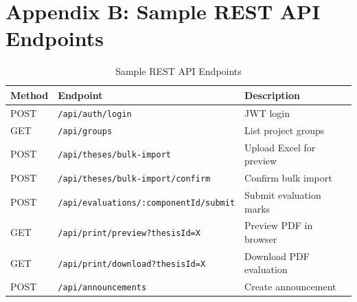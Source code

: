 \documentclass[12pt]{report}
\begin{document}
\section*{Appendix B: Sample REST API Endpoints}
\begin{table}[H]
\centering
\caption{Sample REST API Endpoints}
\label{tab:api_sample}
\begin{tabular}{l l l}
\toprule
\textbf{Method} & \textbf{Endpoint} & \textbf{Description}\\
\midrule
POST & \texttt{/api/auth/login}                       & JWT login\\
GET  & \texttt{/api/groups}                           & List project groups\\
POST & \texttt{/api/theses/bulk-import}               & Upload Excel for preview\\
POST & \texttt{/api/theses/bulk-import/confirm}       & Confirm bulk import\\
POST & \texttt{/api/evaluations/:componentId/submit}  & Submit evaluation marks\\
GET  & \texttt{/api/print/preview?thesisId=X}         & Preview PDF in browser\\
GET  & \texttt{/api/print/download?thesisId=X}        & Download PDF evaluation\\
POST & \texttt{/api/announcements}                    & Create announcement\\
\bottomrule
\end{tabular}
\end{table}
\end{document}

